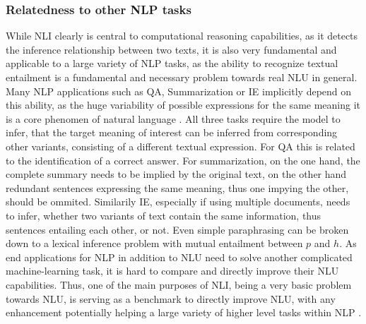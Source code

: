 \subsubsection{Relatedness to other NLP tasks}
While \ac{NLI} clearly is central to computational reasoning capabilities, as it detects the inference relationship between two texts, it is also very fundamental and applicable to a large variety of \ac{NLP} tasks, as the ability to recognize textual entailment is a fundamental and necessary problem towards real \ac{NLU} \citep{maccartney2007natural,bos2005recognising} in general. Many \ac{NLP} applications such as \ac{QA}, Summarization or \ac{IE} implicitly depend on this ability, as the huge variability of possible expressions for the same meaning it is a core phenomen of natural language \citep{dagan2009recognizing}. All three tasks require the model to infer, that the target meaning of interest can be inferred from corresponding other variants, consisting of a different textual expression. For \ac{QA} this is related to the identification of a correct answer. For summarization, on the one hand, the complete summary needs to be implied by the original text, on the other hand redundant sentences expressing the same meaning, thus one impying the other, should be ommited. Similarily \ac{IE}, especially if using multiple documents, needs to infer, whether two variants of text contain the same information, thus sentences entailing each other, or not. Even simple paraphrasing can be broken down to a lexical inference problem with mutual entailment between $p$ and $h$. As end applications for \ac{NLP} in addition to \ac{NLU} need to solve another complicated machine-learning task, it is hard to compare and directly improve their \ac{NLU} capabilities. Thus, one of the main purposes of \ac{NLI}, being a very basic problem towards \ac{NLU}, is serving as a benchmark to directly improve \ac{NLU}, with any enhancement potentially helping a large variety of higher level tasks within \ac{NLP} \citep{williams2017broad,cooper1996using,bos2005recognising,dagan2006pascal}.  

